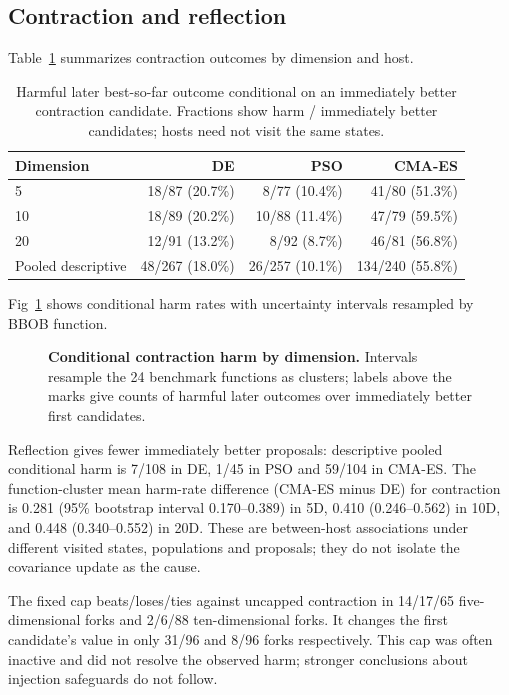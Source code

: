 \documentclass[10pt,letterpaper]{article}
\begin{document}
\subsection*{Contraction and reflection}
Table~\ref{tab:main} summarizes contraction outcomes by dimension and host.
\begin{table}[!ht]
\centering\small
\caption{Harmful later best-so-far outcome conditional on an immediately better contraction candidate. Fractions show harm / immediately better candidates; hosts need not visit the same states.}
\label{tab:main}
\begin{tabular}{lrrr}\toprule
Dimension & DE & PSO & CMA-ES\\\midrule
5 & 18/87 (20.7\%) & 8/77 (10.4\%) & 41/80 (51.3\%)\\
10 & 18/89 (20.2\%) & 10/88 (11.4\%) & 47/79 (59.5\%)\\
20 & 12/91 (13.2\%) & 8/92 (8.7\%) & 46/81 (56.8\%)\\\midrule
Pooled descriptive & 48/267 (18.0\%) & 26/257 (10.1\%) & 134/240 (55.8\%)\\\bottomrule
\end{tabular}
\end{table}
Fig~\ref{fig:host} shows conditional harm rates with uncertainty intervals resampled by BBOB function.
\begin{figure}[!h]\caption{\textbf{Conditional contraction harm by dimension.} Intervals resample the 24 benchmark functions as clusters; labels above the marks give counts of harmful later outcomes over immediately better first candidates.}\label{fig:host}\end{figure}
Reflection gives fewer immediately better proposals: descriptive pooled conditional harm is 7/108 in DE, 1/45 in PSO and 59/104 in CMA-ES. The function-cluster mean harm-rate difference (CMA-ES minus DE) for contraction is 0.281 (95\% bootstrap interval 0.170--0.389) in 5D, 0.410 (0.246--0.562) in 10D, and 0.448 (0.340--0.552) in 20D. These are between-host associations under different visited states, populations and proposals; they do not isolate the covariance update as the cause.

The fixed cap beats/loses/ties against uncapped contraction in 14/17/65 five-dimensional forks and 2/6/88 ten-dimensional forks. It changes the first candidate's value in only 31/96 and 8/96 forks respectively. This cap was often inactive and did not resolve the observed harm; stronger conclusions about injection safeguards do not follow.
\end{document}
